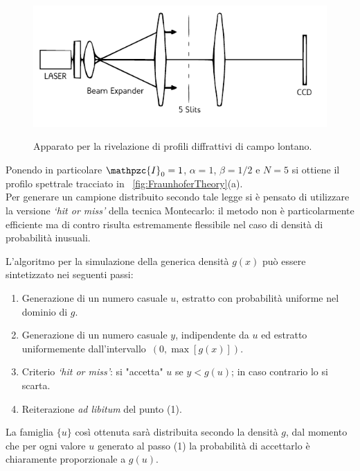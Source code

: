 \begin{figure}[h!]
	\centering
	\caption{Apparato per la rivelazione di profili diffrattivi di campo lontano. }
	\includegraphics[width=.8\linewidth, trim={0 0 0 0.2cm}, clip]{Immagini/SetupFraunhofer}
	\label{fig:SetupDiffraction}
\end{figure}

\vfill

\noindent Ponendo in particolare $\mathpzc{I}_0=1$, $\alpha=1$, $\beta = 1/2$ e $N=5$ si ottiene il profilo spettrale tracciato in \figurename~\ref{fig:FraunhoferTheory}(a).\\

\noindent Per generare un campione distribuito secondo tale legge si è pensato di utilizzare la versione \emph{`hit or miss'} della tecnica Montecarlo: il metodo non è particolarmente efficiente ma di contro risulta estremamente flessibile nel caso di densità di probabilità inusuali.

\vfill

\newpage

\noindent L'algoritmo per la simulazione della generica densità $g(x)$ può essere sintetizzato nei seguenti passi:

\begin{enumerate}
	\item Generazione di un numero casuale $u$, estratto con probabilità uniforme nel dominio di $g$.
	\item Generazione di un numero casuale $y$, indipendente da $u$ ed estratto uniformemente dall'intervallo~$(0, \max[g(x)])$.
	\item Criterio \emph{`hit or miss'}: si "accetta" $u$ se $y < g(u)$; in caso contrario lo si scarta.
	\item Reiterazione \emph{ad libitum} del punto (1).
\end{enumerate}

\noindent La famiglia $\{u\}$ così ottenuta sarà distribuita secondo la densità $g$, dal momento che per ogni valore $u$ generato al passo (1) la probabilità di accettarlo è chiaramente proporzionale a $g(u)$. \\

